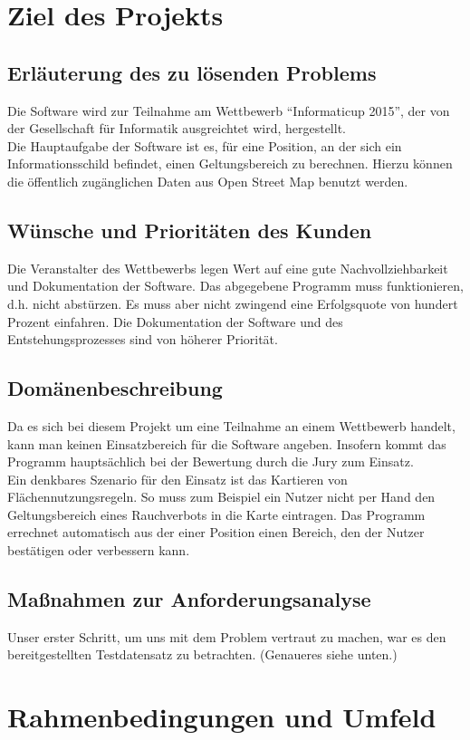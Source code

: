 \section{Ziel des Projekts}
\subsection{Erläuterung des zu lösenden Problems}
Die Software wird zur Teilnahme am Wettbewerb ``Informaticup 2015'', der von der Gesellschaft für Informatik ausgreichtet wird, hergestellt.\\
Die Hauptaufgabe der Software ist es, für eine Position, an der sich ein Informationsschild befindet, einen Geltungsbereich zu berechnen. 
Hierzu können die öffentlich zugänglichen Daten aus Open Street Map benutzt werden.
\subsection{Wünsche und Prioritäten des Kunden}
Die Veranstalter des Wettbewerbs legen Wert auf eine gute Nachvollziehbarkeit und Dokumentation der Software. 
Das abgegebene Programm muss funktionieren, d.h. nicht abstürzen. Es muss aber nicht zwingend eine Erfolgsquote von hundert Prozent einfahren.
Die Dokumentation der Software und des Entstehungsprozesses sind von höherer Priorität.
\subsection{Domänenbeschreibung}
Da es sich bei diesem Projekt um eine Teilnahme an einem Wettbewerb handelt, kann man keinen Einsatzbereich für die Software angeben.
Insofern kommt das Programm hauptsächlich bei der Bewertung durch die Jury zum Einsatz.\\
Ein denkbares Szenario für den Einsatz ist das Kartieren von Flächennutzungsregeln. So muss zum Beispiel ein Nutzer nicht per Hand
den Geltungsbereich eines Rauchverbots in die Karte eintragen. Das Programm errechnet automatisch aus der einer Position einen Bereich, den
der Nutzer bestätigen oder verbessern kann. 
\subsection{Maßnahmen zur Anforderungsanalyse}
Unser erster Schritt, um uns mit dem Problem vertraut zu machen, war es den bereitgestellten Testdatensatz zu betrachten. 
(Genaueres siehe unten.)
\section{Rahmenbedingungen und Umfeld}
